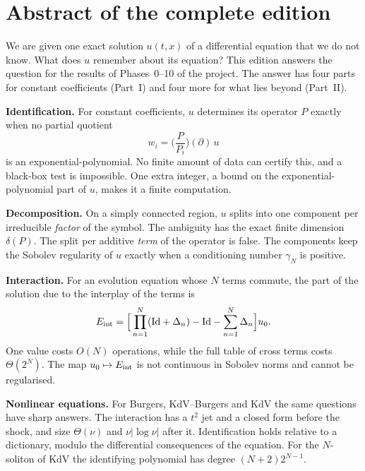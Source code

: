 \section*{Abstract of the complete edition}

We are given one exact solution $u(t,x)$ of a differential equation that we do not know. What does $u$ remember about its equation? This edition answers the question for the results of Phases~0--10 of the project. The answer has four parts for constant coefficients (Part~I) and four more for what lies beyond (Part~II).

\textbf{Identification.} For constant coefficients, $u$ determines its operator $P$ exactly when no partial quotient
\[
w_i=\Big(\frac{P}{P_i}\Big)(\partial)\,u
\]
is an exponential-polynomial. No finite amount of data can certify this, and a black-box test is impossible. One extra integer, a bound on the exponential-polynomial part of $u$, makes it a finite computation.

\textbf{Decomposition.} On a simply connected region, $u$ splits into one component per irreducible \emph{factor} of the symbol. The ambiguity has the exact finite dimension $\delta(P)$. The split per additive \emph{term} of the operator is false. The components keep the Sobolev regularity of $u$ exactly when a conditioning number $\gamma_N$ is positive.

\textbf{Interaction.} For an evolution equation whose $N$ terms commute, the part of the solution due to the interplay of the terms is
\[
E_{\mathrm{int}}=\Big[\prod_{n=1}^N(\mathrm{Id}+\Delta_n)-\mathrm{Id}-\sum_{n=1}^N\Delta_n\Big]u_0 .
\]
One value costs $O(N)$ operations, while the full table of cross terms costs $\Theta(2^N)$. The map $u_0\mapsto E_{\mathrm{int}}$ is not continuous in Sobolev norms and cannot be regularised.

\textbf{Nonlinear equations.} For Burgers, KdV--Burgers and KdV the same questions have sharp answers. The interaction has a $t^2$ jet and a closed form before the shock, and size $\Theta(\nu)$ and $\nu|\log\nu|$ after it. Identification holds relative to a dictionary, modulo the differential consequences of the equation. For the $N$-soliton of KdV the identifying polynomial has degree $(N+2)2^{N-1}$.

